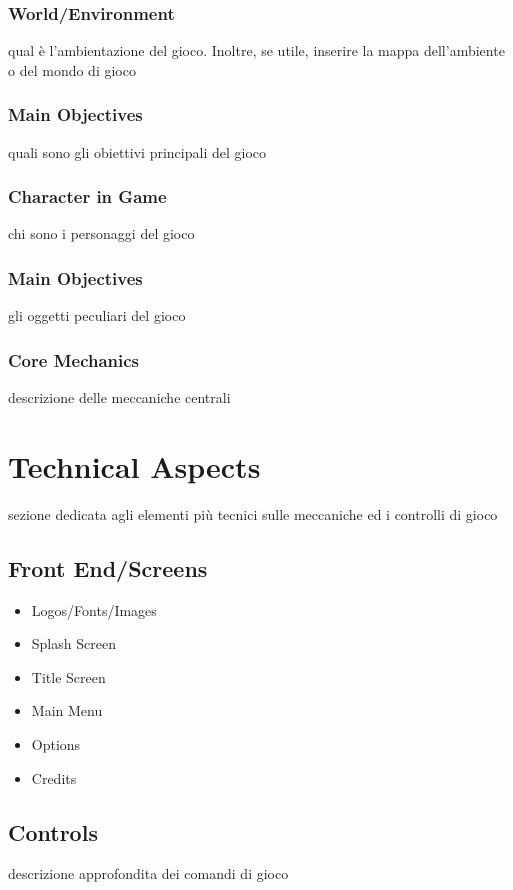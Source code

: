 \documentclass[a4paper]{scrreprt}
\begin{document}
\subsection{World/Environment}
qual è l'ambientazione del gioco. Inoltre, se utile, inserire la mappa dell'ambiente o del mondo di gioco

\subsection{Main Objectives}
quali sono gli obiettivi principali del gioco

\subsection{Character in Game}
chi sono i personaggi del gioco

\subsection{Main Objectives}
gli oggetti peculiari del gioco

\subsection{Core Mechanics}
descrizione delle meccaniche centrali


\chapter{Technical Aspects}
sezione dedicata agli elementi più tecnici sulle meccaniche ed i controlli di gioco

\section{Front End/Screens}

\begin{itemize}
\item Logos/Fonts/Images
\item Splash Screen
\item Title Screen
\item Main Menu
\item Options
\item Credits
\end{itemize}

\section{Controls}
descrizione approfondita dei comandi di gioco
\end{document}

